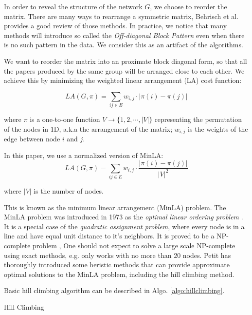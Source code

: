 In order to reveal the structure of the network $G$, we choose to reorder the matrix.
There are many ways to rearrange a symmetric matrix, Behrisch et al. \cite{behrisch_matrix_2016} provides a good review of those methods.
In practice, we notice that many methods will introduce so called the \emph{Off-diagonal Block Pattern} even when there is no such pattern in the data.
We consider this as an artifact of the algorithms.

We want to reorder the matrix into an proximate block diagonal form, so that all the papers produced by the same group will be arranged close to each other.
We achieve this by minimizing the weighted linear arrangement (LA) cost function:

\begin{equation}
    LA(G, \pi) = \sum_{ij \in E} w_{i,j} \cdot |\pi(i) - \pi(j)|
\end{equation}

where $\pi$ is a one-to-one function $V \rightarrow \{1,2,\cdots,|V|\}$ representing the permutation of the nodes in 1D, a.k.a the arrangement of the matrix;
$w_{i,j}$ is the weights of the edge between node $i$ and $j$.

In this paper, we use a normalized version of MinLA:
\begin{equation}
    LA(G, \pi) = \sum_{ij \in E} w_{i,j} \cdot \frac{|\pi(i) - \pi(j)|}{|V|^2}
\end{equation}

where $|V|$ is the number of nodes.

This is known as the minimum linear arrangement (MinLA) problem.
The MinLA problem was introduced in 1973 as the \emph{optimal linear ordering problem} \cite{adolphson_optimal_1973}.
It is a special case of the \emph{quadratic assignment problem}, where every node is in a line and have equal unit distance to it's neighbors.
It is proved to be a NP-complete problem \cite{garey_simplified_1976},
One should not expect to solve a large scale NP-complete using exact methods, 
e.g. \cite{andrade_minimum_2017} only works with no more than 20 nodes.
Petit \cite{petit_experiments_2004} has thoroughly introduced some heristic methods that can provide approximate optimal solutions to the MinLA problem, 
including the hill climbing method.

Basic hill climbing algorithm can be described in Algo. \ref{algo:hillclimbing}. 

\begin{algorithm}
    \caption{Hill Climbing}\label{algo:hillclimbing}
\end{algorithm}

